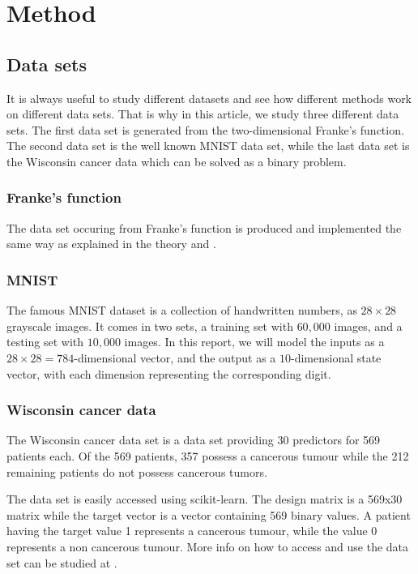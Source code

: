 \documentclass[../main.tex]{subfiles}
\begin{document}
\section{Method}
\subsection{Data sets}
It is always useful to study different datasets and see how different methods work on different data sets. That is why in this article, we study three different data sets. The first data set is generated from the two-dimensional Franke's function. The second data set is the well known MNIST data set, while the last data set is the Wisconsin cancer data which can be solved as a binary problem.

\subsubsection{Franke's function}
The data set occuring from Franke's function is produced and implemented the same way as explained in the theory and \cite{project1}.

\subsubsection{MNIST}
The famous MNIST dataset is a collection of handwritten numbers, as $28\times 28$ grayscale images. It comes in two sets, a training set with $60,000$ images, and a testing set with $10,000$ images. In this report, we will model the inputs as a $28\times 28 = 784$-dimensional vector, and the output as a $10$-dimensional state vector, with each dimension representing the corresponding digit.

\subsubsection{Wisconsin cancer data}
The Wisconsin cancer data set is a data set providing 30 predictors for 569 patients each. Of the 569 patients, 357 possess a cancerous tumour while the 212 remaining patients do not possess cancerous tumors.

The data set is easily accessed using scikit-learn. The design matrix is a 569x30 matrix while the target vector is a vector containing 569 binary values. A patient having the target value 1 represents a cancerous tumour, while the value 0 represents a non cancerous tumour. More info on how to access and use the data set can be studied at \cite{scikit-learn}.
\end{document}
